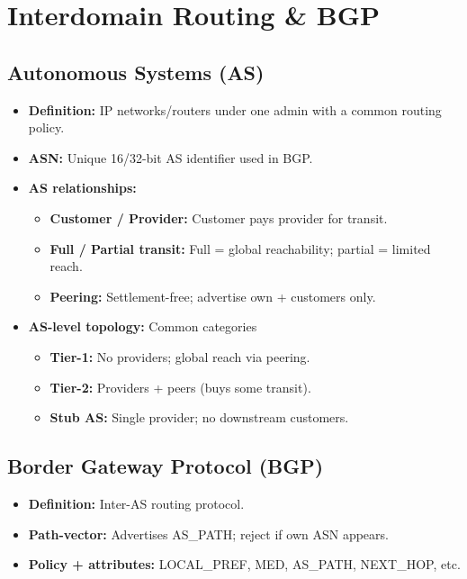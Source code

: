 \section{Interdomain Routing \& BGP}

\subsection{Autonomous Systems (AS)}
\begin{itemize}
    \item \textbf{Definition:} IP networks/routers under one admin with a common routing policy.
    \item \textbf{ASN:} Unique 16/32-bit AS identifier used in BGP.
    \item \textbf{AS relationships:}
    \begin{itemize}
        \item \textbf{Customer / Provider:} Customer pays provider for transit.
        \item \textbf{Full / Partial transit:} Full = global reachability; partial = limited reach.
        \item \textbf{Peering:} Settlement-free; advertise own + customers only.
    \end{itemize}
    \item \textbf{AS-level topology:} Common categories
    \begin{itemize}
        \item \textbf{Tier-1:} No providers; global reach via peering.
        \item \textbf{Tier-2:} Providers + peers (buys some transit).
        \item \textbf{Stub AS:} Single provider; no downstream customers.
    \end{itemize}
\end{itemize}

\subsection{Border Gateway Protocol (BGP)}
\begin{itemize}
    \item \textbf{Definition:} Inter-AS routing protocol.
    \item \textbf{Path-vector:} Advertises AS\_PATH; reject if own ASN appears.
    \item \textbf{Policy + attributes:} LOCAL\_PREF, MED, AS\_PATH, NEXT\_HOP, etc.
\end{itemize}

